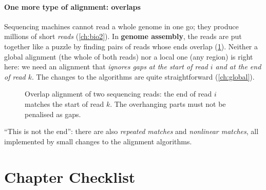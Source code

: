 \documentclass[11pt, oneside]{book}
\let\originalsection\section
\renewcommand{\section}{\Needspace{7\baselineskip}\originalsection}
\begin{document}
\paragraph{One more type of alignment: overlaps}
Sequencing machines cannot read a whole genome in one go; they produce
millions of short \emph{reads} (\cref{ch:bio2}). In \textbf{genome assembly},
the reads are put together like a puzzle by finding pairs of reads whose ends
overlap (\cref{fig:overlap}). Neither a global alignment (the whole of both
reads) nor a local one (any region) is right here: we need an alignment that
\emph{ignores gaps at the start of read $i$ and at the end of read $k$}.
The changes to the algorithms are quite straightforward (\cref{ch:global}).

\begin{figure}[htbp]
\centering
{}
\caption{Overlap alignment of two sequencing reads: the end of read $i$
matches the start of read $k$. The overhanging parts must not be penalised as
gaps.}
\label{fig:overlap}
\end{figure}

``This is not the end'': there are also \emph{repeated matches} and
\emph{nonlinear matches}, all implemented by small changes to the alignment
algorithms.

\section{Chapter Checklist}
\end{document}
